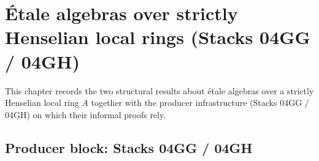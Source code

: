\chapter{Étale algebras over strictly Henselian local rings (Stacks 04GG / 04GH)}
\label{chap:Mathlib_RingTheory_Etale_StrictlyHenselian}

%
%
%

This chapter records the two structural results about étale algebras
over a strictly Henselian local ring $A$ together with the producer
infrastructure (Stacks 04GG / 04GH) on which their informal proofs
rely.

\section*{Producer block: Stacks 04GG / 04GH}

